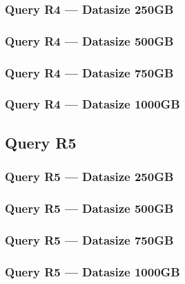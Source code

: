 \subsubsection{Query R4 --- Datasize 250GB}



\newpage
\subsubsection{Query R4 --- Datasize 500GB}



\newpage
\subsubsection{Query R4 --- Datasize 750GB}



\newpage
\subsubsection{Query R4 --- Datasize 1000GB}



\newpage
\subsection{Query R5}
\subsubsection{Query R5 --- Datasize 250GB}



\newpage
\subsubsection{Query R5 --- Datasize 500GB}



\newpage
\subsubsection{Query R5 --- Datasize 750GB}



\newpage
\subsubsection{Query R5 --- Datasize 1000GB}



\newpage
